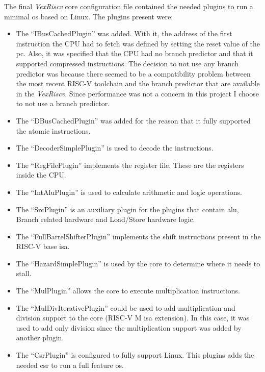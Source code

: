 The final \textit{VexRiscv} core configuration file contained the needed plugins to run a minimal \acrfull{os} based on Linux. The plugins present were:
\begin{itemize}
  \item The \enquote{IBusCachedPlugin} was added. With it, the address of the first instruction the CPU had to fetch was defined by setting the reset value of the \acrfull{pc}. Also, it was specified that the CPU had no branch predictor and that it supported compressed instructions. The decision to not use any branch predictor was because there seemed to be a compatibility problem between the most recent RISC-V toolchain and the branch predictor that are available in the \textit{VexRiscv}. Since performance was not a concern in this project I choose to not use a branch predictor.
  \item The \enquote{DBusCachedPlugin} was added for the reason that it fully supported the atomic instructions.
  \item The \enquote{DecoderSimplePlugin} is used to decode the instructions.
  \item The \enquote{RegFilePlugin} implements the register file. These are the registers inside the CPU.
  \item The \enquote{IntAluPlugin} is used to calculate arithmetic and logic operations.
  \item The \enquote{SrcPlugin} is an auxiliary plugin for the plugins that contain \acrfull{alu}, Branch related hardware and Load/Store hardware logic.
  \item The \enquote{FullBarrelShifterPlugin} implements the shift instructions present in the RISC-V base \acrfull{isa}.
  \item The \enquote{HazardSimplePlugin} is used by the core to determine where it needs to stall.
  \item The \enquote{MulPlugin} allows the core to execute multiplication instructions.
  \item The \enquote{MulDivIterativePlugin} could be used to add multiplication and division support to the core (RISC-V M \acrshort{isa} extension). In this case, it was used to add only division since the multiplication support was added by another plugin.
  \item The \enquote{CsrPlugin} is configured to fully support Linux. This plugins adds the needed \acrfull{csr} to run a full feature \acrshort{os}.

\end{itemize}
